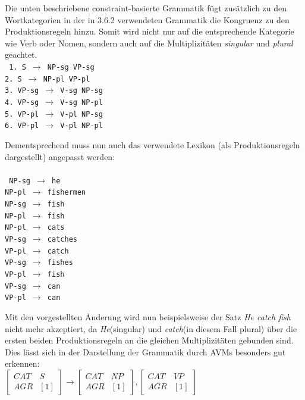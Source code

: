 \documentclass[12pt]{report}
\begin{document}
Die unten beschriebene constraint-basierte Grammatik fügt zusätzlich zu den Wortkategorien in der in 3.6.2 verwendeten Grammatik die Kongruenz zu den Produktionsregeln hinzu. Somit wird nicht nur auf die entsprechende Kategorie wie Verb oder Nomen, sondern auch auf die Multiplizitäten \textit{singular} und \textit{plural} geachtet. \newline
\\
\tt
1. S $\rightarrow$ NP-sg VP-sg\\
2. S $\rightarrow$ NP-pl VP-pl\\
3. VP-sg $\rightarrow$ V-sg NP-sg\\
4. VP-sg $\rightarrow$ V-sg NP-pl\\
5. VP-pl $\rightarrow$ V-pl NP-sg\\
6. VP-pl $\rightarrow$ V-pl NP-pl\\
\rm

Dementsprechend muss nun auch das verwendete Lexikon (als Produktionsregeln dargestellt) angepasst werden:\\
\\
\tt
NP-sg $\rightarrow$ he\\
NP-pl $\rightarrow$ fishermen\\
NP-sg $\rightarrow$ fish\\
NP-pl $\rightarrow$ fish\\
NP-pl $\rightarrow$ cats\\
VP-sg $\rightarrow$ catches\\
VP-pl $\rightarrow$ catch\\
VP-sg $\rightarrow$ fishes\\
VP-pl $\rightarrow$ fish\\
VP-sg $\rightarrow$ can\\
VP-pl $\rightarrow$ can\\
\rm

Mit den vorgestellten Änderung wird nun beispielsweise der Satz \textit{\glqq  He catch fish\grqq{}} nicht mehr akzeptiert, da \textit{\glqq  He\grqq{}}(singular) und \textit{\glqq  catch\grqq{}}(in diesem Fall plural) über die ersten beiden Produktionsregeln an die gleichen Multiplizitäten gebunden sind. 
Dies lässt sich in der Darstellung der Grammatik durch AVMs besonders gut erkennen:\\

$\begin{bmatrix} 
CAT & S \\
AGR & [1]
\end{bmatrix} 
\rightarrow
\begin{bmatrix} 
CAT & NP \\
AGR & [1]
\end{bmatrix},
\begin{bmatrix} 
CAT & VP \\
AGR & [1] 
\end{bmatrix}$ \\
\end{document}
